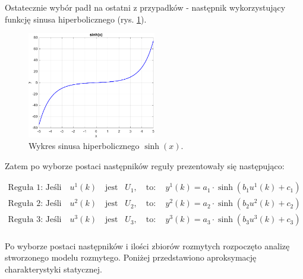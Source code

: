 Ostatecznie wybór padł na ostatni z przypadków - następnik wykorzystujący funkcję sinusa hiperbolicznego (rys. \ref{sinh}). 

\begin{figure}[h!]
\centering
\includegraphics[width=0.5\textwidth]{pictures/sinh}
\caption{Wykres sinusa hiperbolicznego $\sinh(x)$.}
\label{sinh}
\end{figure}

\newpage

Zatem po wyborze postaci następników reguły prezentowały się następująco:

\begin{equation}
\begin{aligned}
\text{Reguła 1: Jeśli} \quad u^1(k) \quad \text{jest} \quad &U_1, \quad \text{to}: \quad y^1(k) = a_1 \cdot \sinh(b_1 u^1(k) + c_1) \\
\text{Reguła 2: Jeśli} \quad u^2(k) \quad \text{jest} \quad &U_2, \quad \text{to}: \quad y^2(k) = a_2 \cdot \sinh(b_2 u^2(k) + c_2) \\ 
\text{Reguła 3: Jeśli} \quad u^3(k) \quad \text{jest} \quad &U_3, \quad \text{to}: \quad y^3(k) = a_3 \cdot \sinh(b_3 u^3(k) + c_3) \\
\end{aligned}
\end{equation}

Po wyborze postaci następników i ilości zbiorów rozmytych rozpoczęto analizę stworzonego modelu rozmytego. Poniżej przedstawiono aproksymację charakterystyki statycznej.

